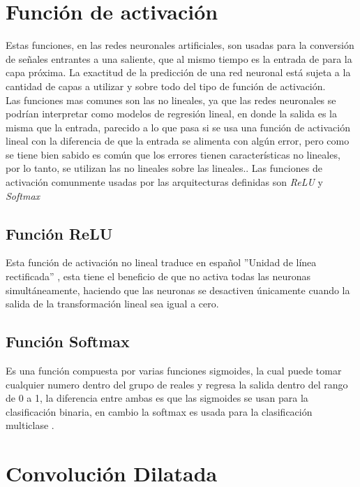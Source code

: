 \section{Función de activación}

Estas funciones, en las redes neuronales artificiales, son usadas para la conversión de señales entrantes a una saliente, que al mismo tiempo es la entrada de para la capa próxima. La exactitud de la predicción de una red neuronal está sujeta a la cantidad de capas a utilizar y sobre todo del tipo de función de activación.\\

Las funciones mas comunes son las no lineales, ya que las redes neuronales se podrían interpretar como modelos de regresión lineal, en donde la salida es la misma que la entrada, parecido a lo que pasa si se usa una función de activación lineal con la diferencia de que la entrada se alimenta con algún error, pero como se tiene bien sabido es común que los errores tienen características   no lineales, por lo tanto, se utilizan las no lineales sobre las lineales.\cite{sharma2017activation}. Las funciones de activación comunmente usadas por las arquitecturas definidas son \textit{ReLU} y \textit	{Softmax}	


\subsection{Función ReLU}

Esta función de activación no lineal traduce en español ”Unidad de línea rectificada” , esta tiene el beneficio de que no activa todas las neuronas simultáneamente, haciendo que las neuronas se desactiven únicamente cuando la salida de la transformación lineal sea igual a cero\cite{sharma2017activation}.

\subsection{Función Softmax}

Es una función compuesta por varias funciones sigmoides, la cual puede tomar cualquier numero dentro del grupo de reales y regresa la salida dentro del rango de 0 a 1, la diferencia entre ambas es que las sigmoides se usan para la clasificación binaria, en cambio la softmax es usada para la clasificación multiclase \cite{sharma2017activation}.

\section{Convolución Dilatada}

